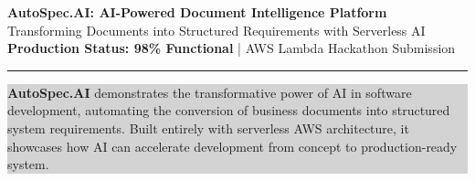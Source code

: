 \documentclass[11pt,letterpaper]{article}
\begin{document}
\begin{center}
{\LARGE\bfseries\color{primaryblue} AutoSpec.AI: AI-Powered Document Intelligence Platform}\\[6pt]
{\large\color{darkgray} Transforming Documents into Structured Requirements with Serverless AI}\\[2pt]
{\small\color{successgreen} \textbf{Production Status: 98\% Functional} | AWS Lambda Hackathon Submission}
\end{center}

\vspace{-4pt}
\hrule
\vspace{8pt}

\begin{center}
\colorbox{lightgray}{\parbox{0.95\linewidth}{
\centering\small
\textbf{AutoSpec.AI} demonstrates the transformative power of AI in software development, automating the conversion of business documents into structured system requirements. Built entirely with serverless AWS architecture, it showcases how AI can accelerate development from concept to production-ready system.
}}
\end{center}

\vspace{6pt}
\end{document}
